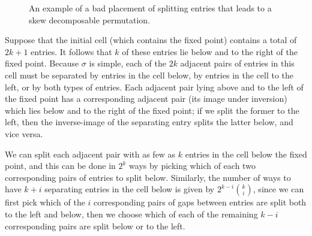     \begin{figure}[t]
    \centering
    \caption[An example of a bad placement]{
        An example of a bad placement of splitting entries that leads to
        a skew decomposable permutation.} 
    \label{involutions:fig:bad-case}
    \end{figure}


    Suppose that the initial cell (which contains the fixed point) contains a total
    of $2k+1$ entries. It follows that $k$ of these entries lie below and to the
    right of the fixed point. Because $\sigma$ is simple, each of the $2k$ adjacent
    pairs of entries in this cell must be separated by entries in the cell below,
    by entries in the cell to the left, or by both types of entries. Each adjacent
    pair lying above and to the left of the fixed point has a corresponding
    adjacent pair (its image under inversion) which lies below and to the right of
    the fixed point; if we split the former to the left, then the inverse-image of
    the separating entry splits the latter below, and vice versa.

    We can split each adjacent pair with as few as $k$ entries in the cell below
    the fixed point, and this can be done in $2^k$ ways by picking which of each
    two corresponding pairs of entries to split below. Similarly, the number of
    ways to have $k+i$ separating entries in the cell below is given by $2^{k-i}{k
    \choose i}$, since we can first pick which of the $i$ corresponding pairs of
    gaps between entries are split both to the left and below, then we choose which
    of each of the remaining $k-i$ corresponding pairs are split below or to the
    left.

